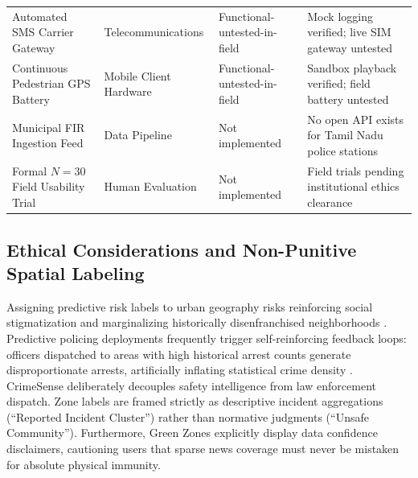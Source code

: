 \documentclass[conference]{IEEEtran}
\begin{document}
\begin{table}[t]
\begin{tabular}{llll}
Automated SMS Carrier Gateway & Telecommunications & Functional-untested-in-field & Mock logging verified; live SIM gateway untested \\
Continuous Pedestrian GPS Battery & Mobile Client Hardware & Functional-untested-in-field & Sandbox playback verified; field battery untested \\
Municipal FIR Ingestion Feed & Data Pipeline & Not implemented & No open API exists for Tamil Nadu police stations \\
Formal $N=30$ Field Usability Trial & Human Evaluation & Not implemented & Field trials pending institutional ethics clearance \\
\bottomrule
\end{tabular}
\end{table}

\subsection{Ethical Considerations and Non-Punitive Spatial Labeling}
Assigning predictive risk labels to urban geography risks reinforcing social stigmatization and marginalizing historically disenfranchised neighborhoods \cite{lum2016predict, richardson2019dirty}. Predictive policing deployments frequently trigger self-reinforcing feedback loops: officers dispatched to areas with high historical arrest counts generate disproportionate arrests, artificially inflating statistical crime density \cite{ensign2018runaway}. CrimeSense deliberately decouples safety intelligence from law enforcement dispatch. Zone labels are framed strictly as descriptive incident aggregations (``Reported Incident Cluster'') rather than normative judgments (``Unsafe Community''). Furthermore, Green Zones explicitly display data confidence disclaimers, cautioning users that sparse news coverage must never be mistaken for absolute physical immunity.
\end{document}
